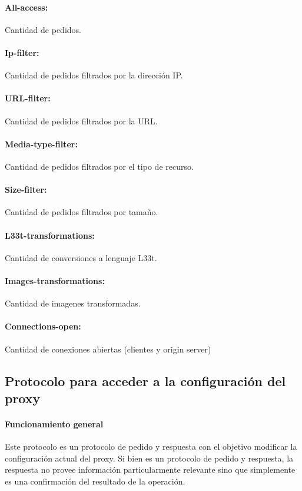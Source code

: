 \documentclass[a4paper,10pt]{article}
\begin{document}
    \paragraph*{All-access:} Cantidad de pedidos.
    \paragraph*{Ip-filter:} Cantidad de pedidos filtrados por la direcci\'on IP.
    \paragraph*{URL-filter:} Cantidad de pedidos filtrados por la URL.
    \paragraph*{Media-type-filter:} Cantidad de pedidos filtrados por el tipo de recurso.
    \paragraph*{Size-filter:} Cantidad de pedidos filtrados por tamaño.
    \paragraph*{L33t-transformations:} Cantidad de conversiones a lenguaje L33t.
    \paragraph*{Images-transformations:} Cantidad de imagenes transformadas.
    \paragraph*{Connections-open:} Cantidad de conexiones abiertas (clientes y origin server)

\newpage
    \subsection{Protocolo para acceder a la configuración del proxy}

        \paragraph*{Funcionamiento general}

        Este protocolo es un protocolo de pedido y respuesta con el objetivo modificar la 
        configuraci\'on actual del proxy. Si bien es un protocolo de pedido y respuesta, la 
        respuesta no provee informaci\'on particularmente relevante sino que simplemente es 
        una confirmaci\'on del resultado de la operaci\'on. 
\end{document}
